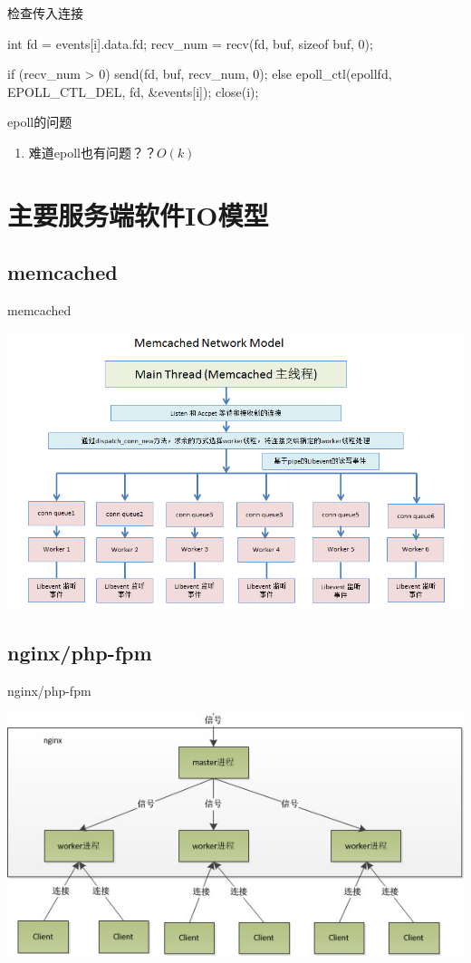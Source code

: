 \documentclass[UTF8]{beamer}
\begin{document}
\begin{frame}[fragile]{检查传入连接}
  \begin{ccode}
    int fd = events[i].data.fd;
    recv_num = recv(fd, buf, sizeof buf, 0);

    if (recv_num > 0) {
      send(fd, buf, recv_num, 0);
    } else {
      epoll_ctl(epollfd, EPOLL_CTL_DEL, fd, &events[i]);
      close(i);
    }
  \end{ccode}
\end{frame}
\begin{frame}[fragile]{epoll的问题}
  \begin{enumerate}
    \item 难道epoll也有问题？？$O(k)$
  \end{enumerate}
\end{frame}
\section{主要服务端软件IO模型}
\subsection{memcached}
\begin{frame}[fragile]{memcached}
  \centerline{\includegraphics[width=\textwidth]{img/memcached-model.jpg}}
\end{frame}
\subsection{nginx/php-fpm}
\begin{frame}[fragile]{nginx/php-fpm}
  \centerline{\includegraphics[width=\textwidth]{img/nginx-model.png}}
\end{frame}
\end{document}
